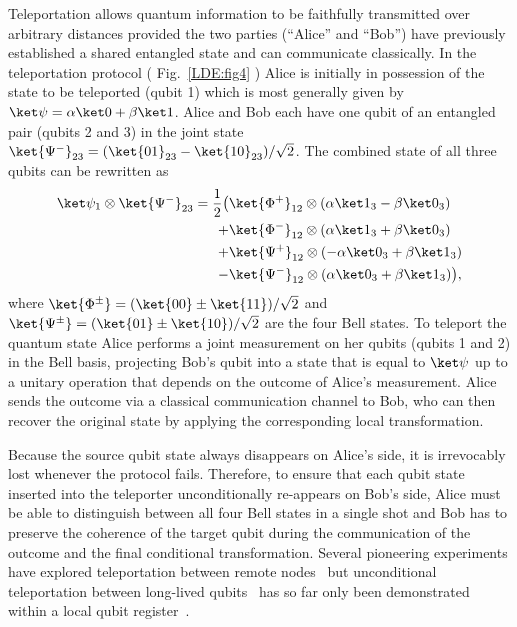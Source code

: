Teleportation allows quantum information to be faithfully transmitted over arbitrary distances provided the two parties (``Alice'' and ``Bob'') have previously established a shared entangled state and can communicate classically.
In the teleportation protocol ( Fig.~\ref{LDE:fig4} ) Alice is initially in possession of the state to be teleported (qubit 1) which is most generally given by $\ket\psi = \alpha\ket0 + \beta\ket1$. Alice and Bob each have one qubit of an entangled pair (qubits 2 and 3) in the joint state $\ket{\Psi^-}_{23} = (\ket{01}_{23} - \ket{10}_{23})/\sqrt2$. The combined state of all three qubits can be rewritten as
\begin{align}
    \ket\psi_1 \otimes \ket{\Psi^-}_{23} = \frac{1}{2} \big( 
        & \ket{\Phi^+}_{12} \otimes (\alpha\ket1_3 - \beta\ket0_3) \nonumber\\
        + & \ket{\Phi^-}_{12} \otimes (\alpha\ket1_3 + \beta\ket0_3) \nonumber\\
        + & \ket{\Psi^+}_{12} \otimes (- \alpha\ket0_3 + \beta\ket1_3) \nonumber\\
        - & \ket{\Psi^-}_{12} \otimes (\alpha\ket0_3 + \beta\ket1_3)
        \big),
\end{align}
where $\ket{\Phi^\pm} = (\ket{00}\pm\ket{11})/\sqrt2$ and $\ket{\Psi^\pm} = (\ket{01}\pm\ket{10})/\sqrt2$ are the four Bell states. To teleport the quantum state Alice performs a joint measurement on her qubits (qubits 1 and 2) in the Bell basis, projecting Bob's qubit into a state that is equal to $\ket\psi$ up to a unitary operation that depends on the outcome of Alice's measurement. Alice sends the outcome via a classical communication channel to Bob, who can then recover the original state by applying the corresponding local transformation.

Because the source qubit state always disappears on Alice's side, it is irrevocably lost whenever the protocol fails. Therefore, to ensure that each qubit state inserted into the teleporter unconditionally re-appears on Bob's side, Alice must be able to distinguish between all four Bell states in a single shot and Bob has to preserve the coherence of the target qubit during the communication of the outcome and the final conditional transformation. Several pioneering experiments have explored teleportation between remote nodes~\cite{Olmschenk_Science_2009,Nolleke_Phys.Rev.Lett._2013,Krauter_NatPhys_2013} but unconditional teleportation between long-lived qubits~\cite{Awschalom_Science_2013,Devoret_Science_2013,Monroe_Science_2013} has so far only been demonstrated within a local qubit register~\cite{Riebe_Nature_2004,Barrett_Nature_2004,Steffen_Nature_2013}.

